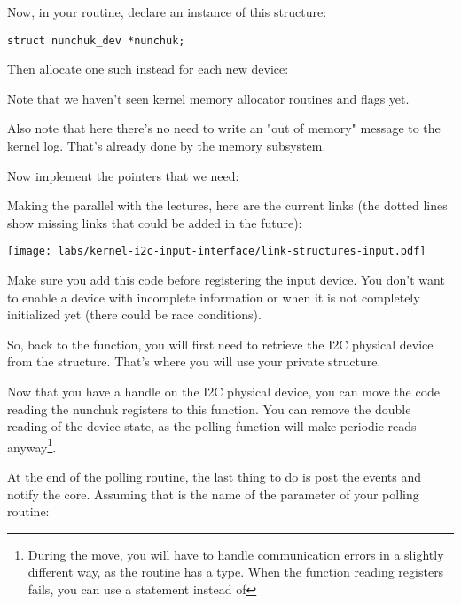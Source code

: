 Now, in your  routine, declare an instance of
this structure:

\begin{verbatim}
struct nunchuk_dev *nunchuk;
\end{verbatim}

Then allocate one such instead for each new device:


Note that we haven't seen kernel memory allocator routines and flags
yet.

Also note that here there's no need to write an "out of memory"
message to the kernel log. That's already done by the memory subsystem.

Now implement the pointers that we need:


Making the parallel with the lectures, here are the current links (the
dotted lines show missing links that could be added in the future):
\begin{center}
\texttt{[image: labs/kernel-i2c-input-interface/link-structures-input.pdf]}
\end{center}

Make sure you add this code before registering the input device. You
don't want to enable a device with incomplete information or when it is
not completely initialized yet (there could be race conditions).

So, back to the  function, you will first need to
retrieve the I2C physical device from the 
structure. That's where you will use your private 
structure.

Now that you have a handle on the I2C physical device, you can move the
code reading the nunchuk registers to this function. You can
remove the double reading of the device state, as the polling function
will make periodic reads anyway\footnote{During the move, you will have
to handle communication errors in a slightly different way, as the
 routine has a  type. When the function
reading registers fails, you can use a  statement instead
of }.

At the end of the polling routine, the last thing to do is post the events
and notify the  core. Assuming that  is the
name of the  parameter of your polling routine:

